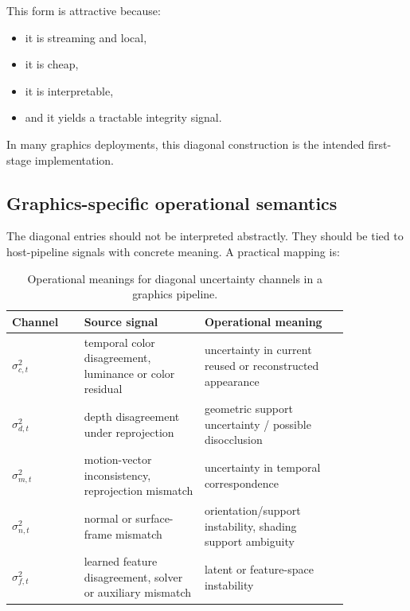 \documentclass[11pt,letterpaper]{article}
\theoremstyle{gcresult}
\theoremstyle{definition}
\begin{document}
This form is attractive because:
\begin{itemize}[leftmargin=1.5em]
    \item it is streaming and local,
    \item it is cheap,
    \item it is interpretable,
    \item and it yields a tractable integrity signal.
\end{itemize}

In many graphics deployments, this diagonal construction is the intended first-stage implementation.


\subsection{Graphics-specific operational semantics}

The diagonal entries should not be interpreted abstractly. They should be tied to host-pipeline signals with concrete meaning. A practical mapping is:

\begin{table}[H]
\centering
\caption{Operational meanings for diagonal uncertainty channels in a graphics pipeline.}
\begin{tabular}{>{\raggedright\arraybackslash}p{0.18\linewidth} >{\raggedright\arraybackslash}p{0.30\linewidth} >{\raggedright\arraybackslash}p{0.36\linewidth}}
\toprule
Channel & Source signal & Operational meaning \\
\midrule
$\sigma^{2}_{c,t}$ & temporal color disagreement, luminance or color residual & uncertainty in current reused or reconstructed appearance \\
$\sigma^{2}_{d,t}$ & depth disagreement under reprojection & geometric support uncertainty / possible disocclusion \\
$\sigma^{2}_{m,t}$ & motion-vector inconsistency, reprojection mismatch & uncertainty in temporal correspondence \\
$\sigma^{2}_{n,t}$ & normal or surface-frame mismatch & orientation/support instability, shading support ambiguity \\
$\sigma^{2}_{f,t}$ & learned feature disagreement, solver or auxiliary mismatch & latent or feature-space instability \\
\bottomrule
\end{tabular}
\end{table}
\end{document}
